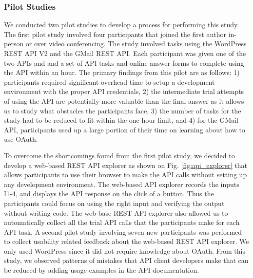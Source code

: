 \subsubsection{Pilot Studies}

We conducted two pilot studies to develop a process for performing this study. The first pilot study involved four participants that joined the first author in-person or over video conferencing. The study involved tasks using the WordPress REST API V2 and the GMail REST API. Each participant was given one of the two APIs and and a set of API tasks and online answer forms to complete using the API within an hour. The primary findings from this pilot are as follows: 1) participants required significant overhead time to setup a development environment with the proper API credentials, 2) the intermediate trial attempts of using the API are potentially more valuable than the final answer as it allows us to study what obstacles the participants face, 3) the number of tasks for the study had to be reduced to fit within the one hour limit, and 4) for the GMail API, participants used up a large portion of their time on learning about how to use  OAuth.

To overcome the shortcomings found from the first pilot study, we decided to develop a web-based REST API explorer as shown on Fig. \ref{fig:api_explorer} that allows participants to use their browser to make the API calls without setting up any development environment. The web-based API explorer records the inputs I1-4, and displays the API response on the click of a button. Thus the participants could focus on using the right input and verifying the output without writing code. The web-base REST API explorer also allowed us to automatically collect all the trial API calls that the participants make for each API task. A second pilot study involving seven new participants was performed to collect usability related feedback about the web-based REST API explorer. We only used WordPress since it did not require knowledge about OAuth. From this study, we observed patterns of mistakes that API client developers make that can be reduced by adding usage examples in the API documentation.

